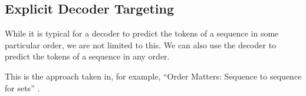 \subsection{Explicit Decoder Targeting}
\label{ss:pure-query}

While it is typical for a decoder to predict the tokens of a sequence in some particular order, we are not limited to this. We can also use the decoder to predict the tokens of a sequence in any order.

This is the approach taken in, for example, ``Order Matters: Sequence to sequence for sets'' \cite{order-matters}.








